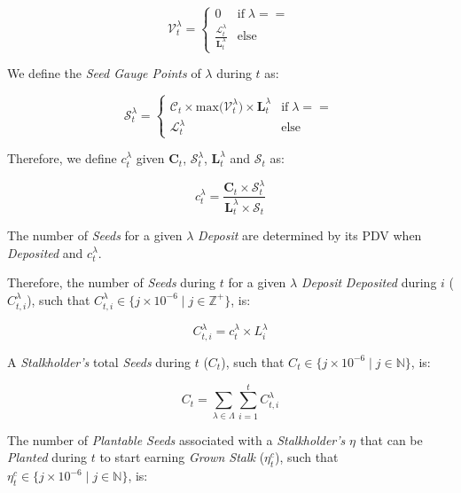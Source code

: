 \documentclass[tikz]{article}
\newcommand{\term}[1]{\textsl{#1}}
\newcommand{\Pinto}{} %
\newcommand{\pinto}{} %
\begin{document}
    $$
        \mathscr{V}_{t}^{\lambda} = 
        \begin{cases}
            0 
                & \text{if} \; \lambda == \Pinto  \\
            
            \frac{\mathscr{L}_{t}^{\lambda}}{\mathbf{L}_{t}^{\lambda}} 
                & \text{else}
        \end{cases} 
    $$

We define the \term{Seed Gauge Points} of $\lambda$ during $t$ as:

    $$ 
        \mathscr{S}_{t}^\lambda =
        \begin{cases}
            {\mathscr{C}_{t} \times \text{max(}\mathscr{V}_{t}^\lambda\text{)} \times \mathbf{L}_{t}^{\lambda}} 
                & \text{if} \; \lambda == \Pinto  \\
            
            {\mathscr{L}_{t}^{\lambda}} 
                & \text{else}
        \end{cases} 
    $$

Therefore, we define $c_{t}^{\lambda}$ given $\mathbf{C}_{t}$, $\mathscr{S}_{t}^{\lambda}$, $\mathbf{L}_{t}^{\lambda}$ and $\mathscr{S}_{t}$ as: 

    $$
        c_{t}^{\lambda} = \frac{\mathbf{C}_{t} \times \mathscr{S}_{t}^{\lambda}}
                                {\mathbf{L}_{t}^{\lambda} \times \mathscr{S}_{t}}
    $$

The number of \term{Seeds} for a given $\lambda$ \term{Deposit} are determined by its PDV when \term{Deposited} and $c_{t}^{\lambda}$.

Therefore, the number of \term{Seeds} during $t$ for a given $\lambda$ \term{Deposit} \term{Deposited} during $i$ ($C_{t,i}^{\lambda}$), such that $C_{t,i}^{\lambda} \in \{j \times 10^{-6} \mid j \in \mathbb{Z}^{+} \}$, is:

    $$
        C_{t,i}^{\lambda} = c_{t}^{\lambda} \times L_{i}^{\lambda}
    $$
    
A \term{Stalkholder's} total \term{Seeds} during $t$ ($C_{t}$), such that $C_{t} \in \{j \times 10^{-6} \mid j \in \mathbb{N} \}$, is:

    $$
        C_{t} = 
            \sum_{\lambda \in \Lambda} 
                \sum_{i=1}^{t} 
                    C_{t,i}^{\lambda}
    $$
    
The number of \term{Plantable Seeds} associated with a \term{Stalkholder's} $\eta^{\pinto}$ that can be \term{Planted} during $t$ to start earning \term{Grown Stalk} ($\eta_{t}^{c}$), such that $\eta_{t}^{c} \in \{j \times 10^{-6} \mid j \in \mathbb{N} \}$, is:
\end{document}
